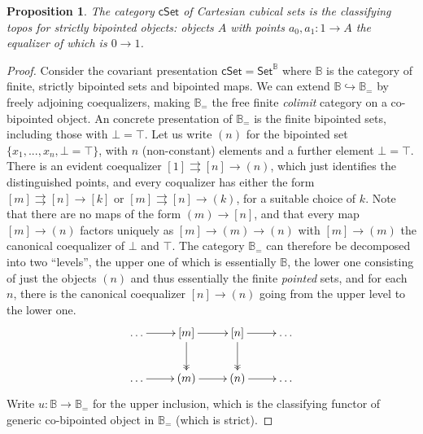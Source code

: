 \documentclass[12pt]{article}
\newcommand{\B}{\ensuremath{\mathbb{B}}}
\newcommand{\Set}{\ensuremath{\mathsf{Set}}}
\newcommand{\cSet}{\ensuremath{\mathsf{cSet}}}
\newcommand{\hook}{\ensuremath{\hookrightarrow}}
\renewcommand{\to}{\ensuremath{\rightarrow}}
\newtheorem{proposition}[theorem]{Proposition}
\theoremstyle{remark}
\theoremstyle{definition}
\begin{document}
\begin{proposition}
The category $\cSet$ of Cartesian cubical sets is the classifying topos for \emph{strictly bipointed objects}: objects $A$ with points $a_0, a_1 : 1\to A$ the equalizer of which is $0\to 1$.
\end{proposition}

\begin{proof}
Consider the covariant presentation $\cSet = \Set^\B$ where $\B$ is the category of finite, strictly bipointed sets and bipointed maps.  We can extend $\B\hook\B_=$ by freely adjoining coequalizers, making $\B_=$ the free finite \emph{colimit} category on a co-bipointed object. An concrete presentation of $\B_=$ is the finite bipointed sets, including those with $\bot=\top$.  Let us write $(n)$ for the bipointed set $\{x_1, ..., x_n, \bot=\top\}$, with $n$ (non-constant) elements and a further element $\bot=\top$.  There is an evident coequalizer $[1]\rightrightarrows [n]\to(n)$, which just identifies the distinguished points, and every coqualizer has either the form $[m]\rightrightarrows [n]\to [k]$ or $[m]\rightrightarrows [n]\to(k)$, for a suitable choice of $k$.  Note that there are no maps of the form $(m)\to [n]$, and that every map $[m]\to (n)$ factors uniquely as $[m]\to (m)\to (n)$ with  $[m]\to(m)$ the canonical coequalizer of $\bot$ and $\top$.  The category $\B_=$ can therefore be decomposed into two ``levels'', the upper one of which is essentially $\B$, the lower one consisting of just the objects $(n)$ and thus essentially the finite \emph{pointed} sets, and for each $n$, there is the canonical coequalizer $[n]\to(n)$ going from the upper level to the lower one.
\[
\xymatrix{
\dots \ar[r] & [m] \ar@{->>}[d] \ar[r] & [n] \ar@{->>}[d] \ar[r] & \dots \\
\dots \ar[r] & (m) \ar[r] & (n) \ar[r] & \dots
}
\]
Write $u : \B\to\B_=$ for the upper inclusion, which is the classifying functor of generic co-bipointed object in $\B_=$ (which is strict).  


\end{proof}
\end{document}
